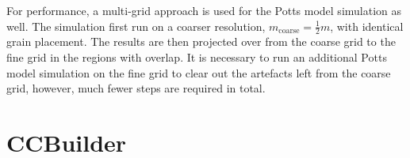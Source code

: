 \documentclass[3p,12pt]{elsarticle}
\begin{document}

For performance, a multi-grid approach is used for the Potts model simulation as well.
The simulation first run on a coarser resolution, $m_\text{coarse} = \frac12 m$, with identical grain placement.
The results are then projected over from the coarse grid to the fine grid in the regions with overlap.
It is necessary to run an additional Potts model simulation on the fine grid to clear out the artefacts left from the coarse grid, however, much fewer steps are required in total.


\section{CCBuilder} \label{sec:ccbuilder}
\end{document}
